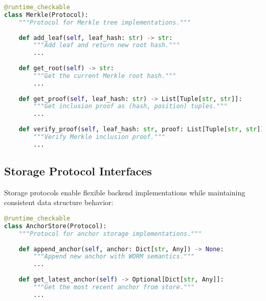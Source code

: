 \documentclass[12pt,a4paper]{article}
\begin{document}
\begin{center}
\end{center}

\begin{lstlisting}[language=Python, caption=Merkle Protocol Interface]
@runtime_checkable
class Merkle(Protocol):
    """Protocol for Merkle tree implementations."""
    
    def add_leaf(self, leaf_hash: str) -> str:
        """Add leaf and return new root hash."""
        ...
    
    def get_root(self) -> str:
        """Get the current Merkle root hash."""
        ...
    
    def get_proof(self, leaf_hash: str) -> List[Tuple[str, str]]:
        """Get inclusion proof as (hash, position) tuples."""
        ...
    
    def verify_proof(self, leaf_hash: str, proof: List[Tuple[str, str]], root: str) -> bool:
        """Verify Merkle inclusion proof."""
        ...
\end{lstlisting}

\subsection{Storage Protocol Interfaces}

Storage protocols enable flexible backend implementations while maintaining consistent data structure behavior:

\begin{lstlisting}[language=Python, caption=Anchor Store Protocol Interface]
@runtime_checkable
class AnchorStore(Protocol):
    """Protocol for anchor storage implementations."""
    
    def append_anchor(self, anchor: Dict[str, Any]) -> None:
        """Append new anchor with WORM semantics."""
        ...
    
    def get_latest_anchor(self) -> Optional[Dict[str, Any]]:
        """Get the most recent anchor from store."""
        ...
\end{lstlisting}
\end{document}

